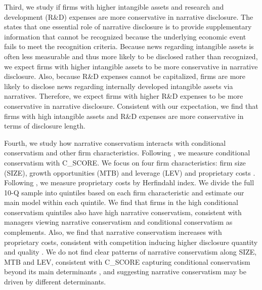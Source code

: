 \documentclass[letterpaper,12pt]{article}
\begin{document}
\begin{spacing}{1.5}
Third, we study if firms with higher intangible assets and research and development (R\&D) expenses are more conservative in narrative disclosure. The  states that one essential role of narrative disclosure is to provide supplementary information that cannot be recognized because the underlying economic event fails to meet the recognition criteria. Because news regarding intangible assets is often less measurable and thus more likely to be disclosed rather than recognized, we expect firms with higher intangible assets to be more conservative in narrative disclosure. Also, because R\&D expenses cannot be capitalized, firms are more likely to disclose news regarding internally developed intangible assets via narratives. Therefore, we expect firms with higher R\&D expenses to be more conservative in narrative disclosure. Consistent with our expectation, we find that firms with high intangible assets and R\&D expenses are more conservative in terms of disclosure length.

Fourth, we study how narrative conservatism interacts with conditional conservatism and other firm characteristics. Following , we measure conditional conservatism with C\_SCORE. We focus on four firm characteristics: firm size (SIZE), growth opportunities (MTB) and leverage (LEV) \cite{wattsConservatismAccountingPart2003, qiangEffectsContractingLitigation2007, khanEstimationEmpiricalProperties2009, laraEconomicDeterminantsConditional2009} and proprietary costs \cite{verrecchiaDiscretionaryDisclosure1983, liImpactsProductMarket2010}. Following , we measure proprietary costs by Herfindahl index. We divide the full 10-Q sample into quintiles based on each firm characteristic and estimate our main model within each quintile. We find that firms in the high conditional conservatism quintiles also have high narrative conservatism, consistent with managers viewing narrative conservatism and conditional conservatism as complements. Also, we find that narrative conservatism increases with proprietary costs, consistent with competition inducing higher disclosure quantity and quality \cite{liImpactsProductMarket2010}. We do not find clear patterns of narrative conservatism along SIZE, MTB and LEV, consistent with C\_SCORE capturing conditional conservatism beyond its main determinants \cite{khanEstimationEmpiricalProperties2009}, and suggesting narrative conservatism may be driven by different determinants.


\end{spacing}
\end{document}

